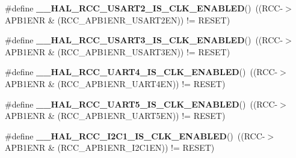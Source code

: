 \begin{DoxyCompactItemize}
\mbox{\label{group___r_c_c_ex___peripheral___clock___enable___disable___status_gad3bbe0639658ed2cc56f8328b26373ea}} 
\#define {\bfseries \+\_\+\+\_\+\+H\+A\+L\+\_\+\+R\+C\+C\+\_\+\+U\+S\+A\+R\+T2\+\_\+\+I\+S\+\_\+\+C\+L\+K\+\_\+\+E\+N\+A\+B\+L\+ED}()~((R\+CC-\/$>$A\+P\+B1\+E\+NR \& (R\+C\+C\+\_\+\+A\+P\+B1\+E\+N\+R\+\_\+\+U\+S\+A\+R\+T2\+EN)) != R\+E\+S\+ET)
\item 
\mbox{\label{group___r_c_c_ex___peripheral___clock___enable___disable___status_ga5addec8b6604857d81c1386cad21c391}} 
\#define {\bfseries \+\_\+\+\_\+\+H\+A\+L\+\_\+\+R\+C\+C\+\_\+\+U\+S\+A\+R\+T3\+\_\+\+I\+S\+\_\+\+C\+L\+K\+\_\+\+E\+N\+A\+B\+L\+ED}()~((R\+CC-\/$>$A\+P\+B1\+E\+NR \& (R\+C\+C\+\_\+\+A\+P\+B1\+E\+N\+R\+\_\+\+U\+S\+A\+R\+T3\+EN)) != R\+E\+S\+ET)
\item 
\mbox{\label{group___r_c_c_ex___peripheral___clock___enable___disable___status_ga76b47e85a8669651c01256ec11ebdc3f}} 
\#define {\bfseries \+\_\+\+\_\+\+H\+A\+L\+\_\+\+R\+C\+C\+\_\+\+U\+A\+R\+T4\+\_\+\+I\+S\+\_\+\+C\+L\+K\+\_\+\+E\+N\+A\+B\+L\+ED}()~((R\+CC-\/$>$A\+P\+B1\+E\+NR \& (R\+C\+C\+\_\+\+A\+P\+B1\+E\+N\+R\+\_\+\+U\+A\+R\+T4\+EN)) != R\+E\+S\+ET)
\item 
\mbox{\label{group___r_c_c_ex___peripheral___clock___enable___disable___status_gabb2b7e20045558372779949fb841ae00}} 
\#define {\bfseries \+\_\+\+\_\+\+H\+A\+L\+\_\+\+R\+C\+C\+\_\+\+U\+A\+R\+T5\+\_\+\+I\+S\+\_\+\+C\+L\+K\+\_\+\+E\+N\+A\+B\+L\+ED}()~((R\+CC-\/$>$A\+P\+B1\+E\+NR \& (R\+C\+C\+\_\+\+A\+P\+B1\+E\+N\+R\+\_\+\+U\+A\+R\+T5\+EN)) != R\+E\+S\+ET)
\item 
\mbox{\label{group___r_c_c_ex___peripheral___clock___enable___disable___status_ga7570e5654fd61b44dabe0546e524c906}} 
\#define {\bfseries \+\_\+\+\_\+\+H\+A\+L\+\_\+\+R\+C\+C\+\_\+\+I2\+C1\+\_\+\+I\+S\+\_\+\+C\+L\+K\+\_\+\+E\+N\+A\+B\+L\+ED}()~((R\+CC-\/$>$A\+P\+B1\+E\+NR \& (R\+C\+C\+\_\+\+A\+P\+B1\+E\+N\+R\+\_\+\+I2\+C1\+EN)) != R\+E\+S\+ET)
\item 
\mbox{\label{group___r_c_c_ex___peripheral___clock___enable___disable___status_ga2ae540056d72f4230da38c082b6c34c1}} 

\end{DoxyCompactItemize}
